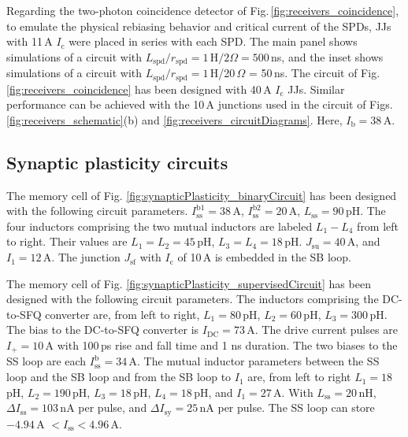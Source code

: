 \documentclass[twocolumn]{article}
\begin{document}
Regarding the two-photon coincidence detector of Fig.\,\ref{fig:receivers_coincidence}, to emulate the physical rebiasing behavior and critical current of the SPDs, JJs with 11\,\textmu A $I_{\mathrm{c}}$ were placed in series with each SPD. The main panel shows simulations of a circuit with $L_{\mathrm{spd}}/r_{\mathrm{spd}} = 1$\,\textmu H$/2\Omega = 500$\,ns, and the inset shows simulations of a circuit with $L_{\mathrm{spd}}/r_{\mathrm{spd}} = 1$\,\textmu H/20\,$\Omega$ = 50\,ns. The circuit of Fig.\,\ref{fig:receivers_coincidence} has been designed with 40\,\textmu A $I_{\mathrm{c}}$ JJs. Similar performance can be achieved with the 10\,\textmu A junctions used in the circuit of Figs.\,\ref{fig:receivers_schematic}(b) and \ref{fig:receivers_circuitDiagrams}. Here, $I_{\mathrm{b}} = 38$\,\textmu A. 

\subsection{Synaptic plasticity circuits}
The memory cell of Fig. \ref{fig:synapticPlasticity_binaryCircuit} has been designed with the following circuit parameters. $I_{\mathrm{ss}}^{\mathrm{b1}} = 38$\,\textmu A, $I_{\mathrm{ss}}^{\mathrm{b2}} = 20$\,\textmu A, $L_{\mathrm{ss}} = 90$\,pH. The four inductors comprising the two mutual inductors are labeled $L_1-L_4$ from left to right. Their values are $L_1=L_2=45$\,pH, $L_3=L_4=18$\,pH. $J_{\mathrm{su}} = 40$\,\textmu A, and $I_1 = 12$\,\textmu A. The junction $J_{\mathrm{sf}}$ with $I_{\mathrm{c}}$ of 10\,\textmu A is embedded in the SB loop. 

The memory cell of Fig. \ref{fig:synapticPlasticity_supervisedCircuit} has been designed with the following circuit parameters. The inductors comprising the DC-to-SFQ converter are, from left to right, $L_1 = 80$\,pH, $L_2 = 60$\,pH, $L_3 = 300$\,pH. The bias to the DC-to-SFQ converter is $I_{\mathrm{DC}} = 73$\,\textmu A. The drive current pulses are $I_{+} = 10$\,\textmu A with 100\,ps rise and fall time and 1 ns duration. The two biases to the SS loop are each $I_{\mathrm{ss}}^{\mathrm{b}} = 34$\,\textmu A. The mutual inductor parameters between the SS loop and the SB loop and from the SB loop to $I_1$ are, from left to right $L_1 = 18$\,pH, $L_2 = 190$\,pH, $L_3 = 18$\,pH, $L_4 = 18$\,pH, and $I_1 = 27$\,\textmu A. With $L_{\mathrm{ss}} = 20$\,nH, $\Delta I_{\mathrm{ss}} = 103$\,nA per pulse, and $\Delta I_{\mathrm{sy}} = 25$\,nA per pulse. The SS loop can store $-4.94$\,\textmu A $< I_{\mathrm{ss}} < 4.96$\,\textmu A.
\end{document}
